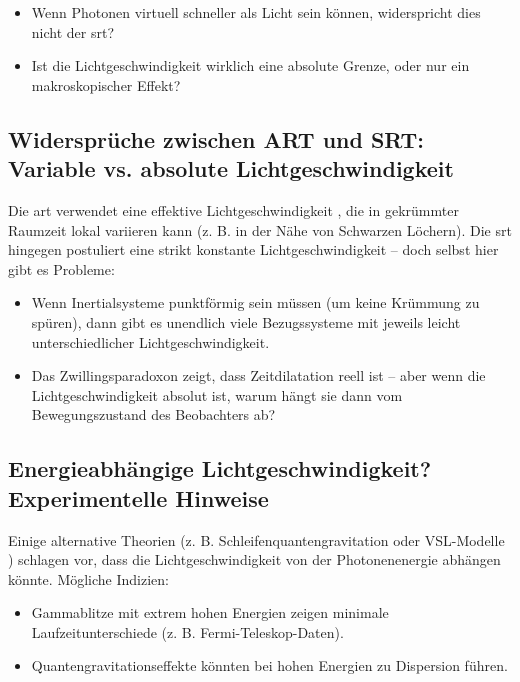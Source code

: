 \begin{itemize}
    \item Wenn Photonen virtuell schneller als Licht sein können, widerspricht dies nicht der \gls{srt}?
    \item Ist die Lichtgeschwindigkeit wirklich eine absolute Grenze, oder nur ein makroskopischer Effekt?
\end{itemize}

\subsection{Widersprüche zwischen ART und SRT: Variable vs. absolute Lichtgeschwindigkeit}
Die \gls{art} verwendet eine effektive Lichtgeschwindigkeit \cite{MisnerThorneWheeler1973}, die in gekrümmter Raumzeit lokal variieren kann (z. B. in der Nähe von Schwarzen Löchern).
Die \gls{srt} hingegen postuliert eine strikt konstante Lichtgeschwindigkeit – doch selbst hier gibt es Probleme:

\begin{itemize}
    \item Wenn Inertialsysteme punktförmig sein müssen \cite{Einstein1905} (um keine Krümmung zu spüren), dann gibt es unendlich viele Bezugssysteme mit jeweils leicht unterschiedlicher
    Lichtgeschwindigkeit.
    \item Das Zwillingsparadoxon zeigt, dass Zeitdilatation reell ist – aber wenn die Lichtgeschwindigkeit absolut ist, warum hängt sie dann vom Bewegungszustand des
    Beobachters ab?
\end{itemize}

\subsection{Energieabhängige Lichtgeschwindigkeit? Experimentelle Hinweise}
Einige alternative Theorien (z. B. Schleifenquantengravitation oder VSL-Modelle \cite{AmelinoCamelia2013, Magueijo2003}) schlagen vor, dass die Lichtgeschwindigkeit von der Photonenenergie abhängen könnte.
Mögliche Indizien:

\begin{itemize}
    \item Gammablitze mit extrem hohen Energien zeigen minimale Laufzeitunterschiede \cite{MAGIC2016} (z. B. Fermi-Teleskop-Daten).
    \item Quantengravitationseffekte könnten bei hohen Energien zu Dispersion führen.
\end{itemize}

